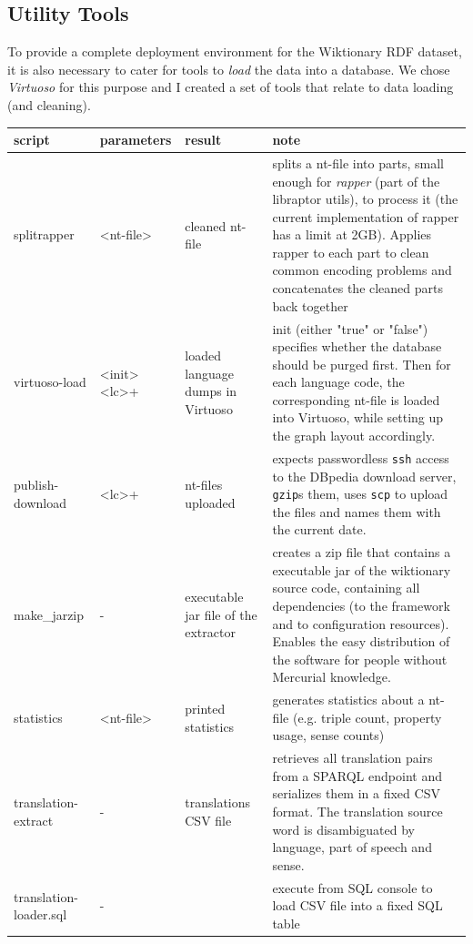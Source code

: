 \subsection{Utility Tools}
To provide a complete deployment environment for the Wiktionary RDF dataset, it is also necessary to cater for tools to \textit{load} the data into a database. We chose \textit{Virtuoso} for this purpose and I created a set of tools that relate to data loading (and cleaning).

\begin{footnotesize}
\begin{tabular}{|p{}|p{}|p{}|p{}|}
\hline \textbf{script} & \textbf{parameters} & \textbf{result} & \textbf{note} \\ 
\hline splitrapper & <nt-file> & cleaned nt-file & splits a nt-file into parts, small enough for \textit{rapper} (part of the libraptor utils), to process it (the current implementation of rapper has a limit at 2GB). Applies rapper to each part to clean common encoding problems and concatenates the cleaned parts back together \\ 
\hline virtuoso-load & <init> <lc>+ & loaded language dumps in Virtuoso & init (either "true" or "false") specifies whether the database should be purged first. Then for each language code, the corresponding nt-file is loaded into Virtuoso, while setting up the graph layout accordingly. \\
\hline publish-download & <lc>+ & nt-files uploaded &  expects passwordless \texttt{ssh} access to the DBpedia download server, \texttt{gzip}s them, uses \texttt{scp} to upload the files and names them with the current date.\\
\hline make\_jarzip & - & executable jar file of the extractor & creates a zip file that contains a executable jar of the wiktionary source code, containing all dependencies (to the framework and to configuration resources). Enables the easy distribution of the software for people without Mercurial knowledge.\\
\hline statistics & <nt-file> & printed statistics & generates statistics about a nt-file (e.g. triple count, property usage, sense counts)\\
\hline translation-extract & - & translations CSV file & retrieves all translation pairs from a SPARQL endpoint and serializes them in a fixed CSV format. The translation source word is disambiguated by language, part of speech and sense.\\
\hline translation-loader.sql & - &  & execute from SQL console to load CSV file into a fixed SQL table \\
\hline 
\end{tabular} 
\end{footnotesize}

